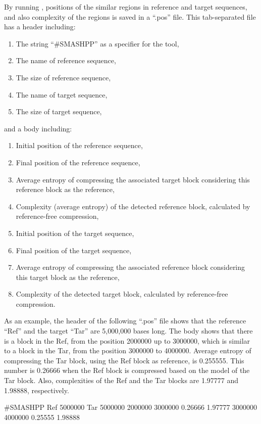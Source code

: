 By running \smashpp, positions of the similar regions in reference and target sequences, and also complexity of the regions is saved in a ``.pos'' file. This tab-separated file has a header including:
\begin{enumerate}
  \item The string ``\#SMASHPP'' as a specifier for the \smashpp tool,
  \item The name of reference sequence,
  \item The size of reference sequence,
  \item The name of target sequence,
  \item The size of target sequence,
\end{enumerate}
and a body including:
\begin{enumerate}
  \item Initial position of the reference sequence,
  \item Final position of the reference sequence,
  \item Average entropy of compressing the associated target block considering this reference block as the reference,
  \item Complexity (average entropy) of the detected reference block, calculated by reference-free compression,
  \item Initial position of the target sequence,
  \item Final position of the target sequence,
  \item Average entropy of compressing the associated reference block considering this target block as the reference,
  \item Complexity of the detected target block, calculated by reference-free compression.
\end{enumerate}
As an example, the header of the following ``.pos'' file shows that the reference ``Ref'' and the target ``Tar'' are 5,000,000 bases long. The body shows that there is a block in the Ref, from the position 2000000 up to 3000000, which is similar to a block in the Tar, from the position 3000000 to 4000000. Average entropy of compressing the Tar block, using the Ref block as reference, is 0.255555. This number is 0.26666 when the Ref block is compressed based on the model of the Tar block. Also, complexities of the Ref and the Tar blocks are 1.97777 and 1.98888, respectively.
\begin{code}[style=bash]
#SMASHPP Ref      5000000  Tar      5000000
2000000	 3000000  0.26666  1.97777  3000000  4000000  0.25555 1.98888
\end{code}


